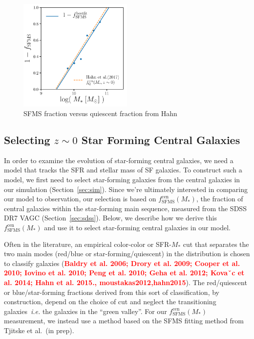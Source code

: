 \documentclass[12pt, letterpaper, preprint]{aastex}
\newcommand{\todo}[1]{{\bf \textcolor{red}{#1}}}
\begin{document}
\begin{figure}
\begin{center}
\includegraphics[width=0.5\textwidth]{figs/fq_fsfms.pdf}
\caption{SFMS fraction versus quiescent fraction from Hahn}
\label{fig:fq_fsfms}
\end{center}
\end{figure}

\subsection{Selecting $z \sim 0$ Star Forming Central Galaxies}  
In order to examine the evolution of star-forming central galaxies, we need
a model that tracks the SFR and stellar mass of SF galaxies. 
To construct such a model, we first need to select star-forming galaxies 
from the central galaxies in our simulation (Section~\ref{sec:sim}). Since 
we're ultimately interested in comparing our model to observation, our 
selection is based on $f^\mathrm{cen}_\mathrm{SFMS}(M_*)$, the fraction 
of central galaxies within the star-forming main sequence, measured 
from the SDSS DR7 VAGC (Section~\ref{sec:sdss}). Below, we 
describe how we derive this $f^\mathrm{cen}_\mathrm{SFMS}(M_*)$ and use it 
to select star-forming central galaxies in our model. 

Often in the literature, an empirical color-color or SFR-$M_*$ cut 
that separates the two main modes (red/blue or star-forming/quiescent) 
in the distribution is chosen to classify galaxies 
(\todo{Baldry et al. 2006; Drory et al. 2009; Cooper et al. 2010; Iovino et al. 2010; Peng et al. 2010; Geha et al. 2012; Kovaˇc et al. 2014; Hahn et al. 2015., moustakas2012,hahn2015}). 
The red/quiescent or blue/star-forming fractions derived from this sort of 
classification, by construction, depend on the choice of cut and neglect the 
transitioning galaxies~\emph{i.e.} the galaxies in the ``green valley''. 
For our $f^\mathrm{cen}_\mathrm{SFMS}(M_*)$ measurement, we instead use a 
method based on the SFMS fitting method from Tjitske et al.~(in prep). 
\end{document}
